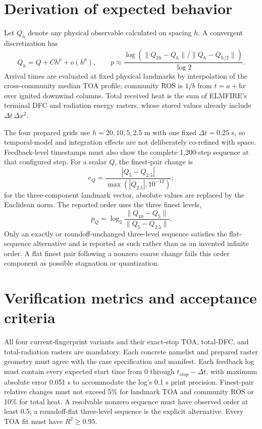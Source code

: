 \section{Derivation of expected behavior}
Let $Q_h$ denote any physical observable calculated on spacing $h$.  A convergent discretization has
\begin{equation}
 Q_h=Q+C h^p+o(h^p),
 \qquad
 p\approx\frac{\log\left(\lVert Q_{2h}-Q_h\rVert/\lVert Q_h-Q_{h/2}\rVert\right)}{\log 2}.
\end{equation}
Arrival times are evaluated at fixed physical landmarks by interpolation of the cross-community median TOA profile; community ROS is $1/b$ from $t=a+bx$ over ignited downwind columns.  Total received heat is the sum of ELMFIRE's terminal DFC and radiation energy rasters, whose stored values already include $\Delta t\,\Delta x^2$.

The four prepared grids use $h=20,10,5,2.5$ m with one fixed $\Delta t=0.25$ s, so temporal-model and integration effects are not deliberately co-refined with space.  Feedback-level timestamps must also show the complete 1,200-step sequence at that configured step.  For a scalar $Q$, the finest-pair change is
\[
 e_Q=\frac{|Q_{5}-Q_{2.5}|}{\max(|Q_{2.5}|,10^{-12})};
\]
for the three-component landmark vector, absolute values are replaced by the Euclidean norm.  The reported order uses the three finest levels,
\[
 p_Q=\log_2\frac{\lVert Q_{10}-Q_5\rVert}{\lVert Q_5-Q_{2.5}\rVert}.
\]
Only an exactly or roundoff-unchanged three-level sequence satisfies the flat-sequence alternative and is reported as such rather than as an invented infinite order.  A flat finest pair following a nonzero coarse change fails this order component as possible stagnation or quantization.

\section{Verification metrics and acceptance criteria}
All four current-fingerprint variants and their exact-stop TOA, total-DFC, and total-radiation rasters are mandatory.  Each concrete namelist and prepared raster geometry must agree with the case specification and manifest.  Each feedback log must contain every expected start time from 0 through $t_{stop}-\Delta t$, with maximum absolute error 0.051 s to accommodate the log's 0.1 s print precision.  Finest-pair relative changes must not exceed 5\% for landmark TOA and community ROS or 10\% for total heat.  A resolvable nonzero sequence must have observed order at least 0.5; a roundoff-flat three-level sequence is the explicit alternative.  Every TOA fit must have $R^2\geq0.95$.

